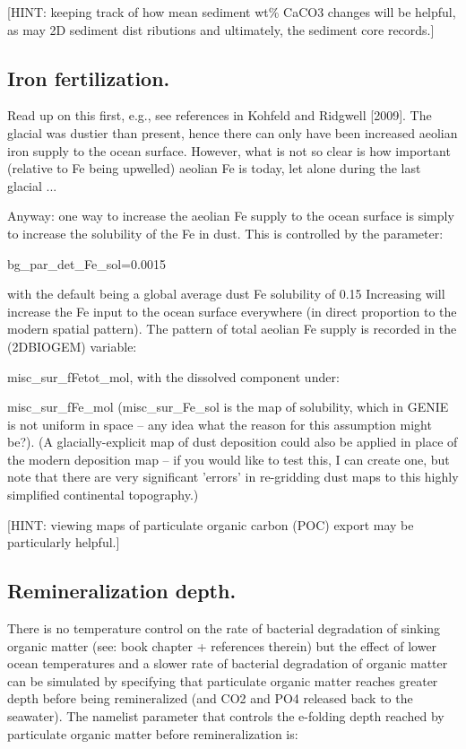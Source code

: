 \documentclass[11pt,fleqn]{book} %
\begin{document}
[HINT: keeping track of how mean sediment wt\% CaCO3 changes will be helpful, as may
2D sediment dist
ributions and ultimately, the sediment core records.]

%
\subsection{Iron fertilization.}

Read up on this first, e.g., see references in Kohfeld and Ridgwell [2009].
The glacial was dustier than present, hence there can only have been increased aeolian
iron supply to the ocean surface. However, what is not so clear is how important (relative to
Fe being upwelled) aeolian Fe is today, let alone during the last glacial ...

Anyway: one way to increase the aeolian Fe supply to the ocean surface is simply to
increase the solubility of the Fe in dust. This is controlled by the parameter:

bg\_par\_det\_Fe\_sol=0.0015

with the default being a global average dust Fe solubility of 0.15%
Increasing will increase the Fe input to the ocean surface everywhere (in direct proportion
to the modern spatial pattern). The pattern of total aeolian Fe supply is recorded in the (2DBIOGEM) variable: 

misc\_sur\_fFetot\_mol, with the dissolved component under:

misc\_sur\_fFe\_mol (misc\_sur\_Fe\_sol is the map of solubility, which in GENIE is not
uniform in space -- any idea what the reason for this assumption might be?).
(A glacially-explicit map of dust deposition could also be applied in place of the modern
deposition map -- if you would like to test this, I can create one, but note that there are very
significant 'errors' in re-gridding dust maps to this highly simplified continental topography.)

[HINT: viewing maps of particulate organic carbon (POC) export may be particularly
helpful.]

%
\subsection{Remineralization depth.}

There is no temperature control on the rate of bacterial
degradation of sinking organic matter (see: book chapter + references therein) but the
effect of lower ocean temperatures and a slower rate of bacterial degradation of organic
matter can be simulated by specifying that particulate organic matter reaches greater depth
before being remineralized (and CO2 and PO4 released back to the seawater). The namelist
parameter that controls the e-folding depth reached by particulate organic matter before
remineralization is:
\end{document}
